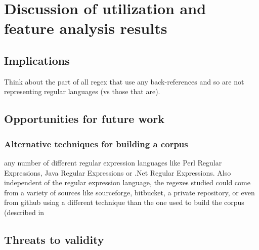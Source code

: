 \section{Discussion of utilization and feature analysis results}
\label{sec:featureDiscussion}

\subsection{Implications}
Think about the part of all regex that use any back-references and so are not representing regular languages (vs those that are).
\subsection{Opportunities for future work}

\subsubsection{Alternative techniques for building a corpus}
\label{sec:alternateCorpus}
any number of different regular expression languages like Perl Regular Expressions, Java Regular Expressions or .Net Regular Expressions.  Also independent of the regular expression language, the regexes studied could come from a variety of sources like sourceforge, bitbucket, a private repository, or even from github using a different technique than the one used to build the corpus (described in


\subsection{Threats to validity}
